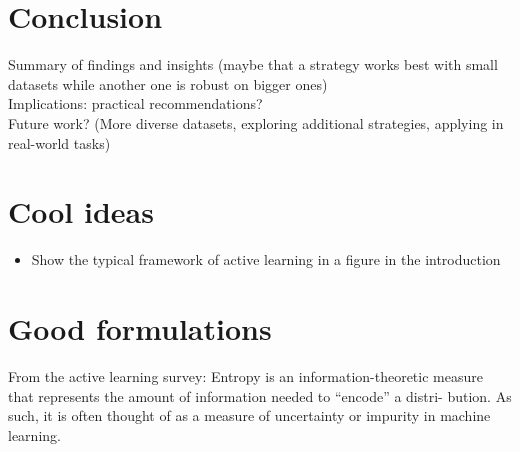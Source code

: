\documentclass{article}
\theoremstyle{plain}
\theoremstyle{definition}
\theoremstyle{remark}
\begin{document}
\section{Conclusion}\label{sec:conclusion}
Summary of findings and insights (maybe that a strategy works best with small datasets while another one is robust on bigger ones)
\\
Implications: practical recommendations?
\\
Future work? (More diverse datasets, exploring additional strategies, applying in real-world tasks)

\section{Cool ideas}
\begin{itemize}
	\item Show the typical framework of active learning in a figure in the introduction
\end{itemize}

\section{Good formulations}
From the active learning survey: Entropy is an information-theoretic
measure that represents the amount of information needed to “encode” a distri-
bution. As such, it is often thought of as a measure of uncertainty or impurity in machine learning.



\end{document}
